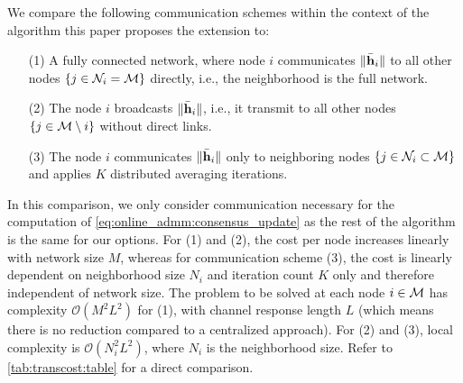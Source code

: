 \documentclass{article}
\begin{document}
We compare the following communication schemes within the context of the algorithm \cite{blochbergerDBSI} this paper proposes the extension to:
\begin{itemize}
    \itemsep-0.2em
    \item[(1)] A fully connected network, where node \(i\) communicates \(\|\bar{\bm{\mathrm{h}}}_i\|\) to all other nodes \(\{j \in \mathcal{N}_i = \mathcal{M}\}\) directly, i.e., the neighborhood is the full network.
    \item[(2)] The node \(i\) broadcasts \(\|\bar{\bm{\mathrm{h}}}_i\|\), i.e., it transmit to all other nodes \(\{j \in \mathcal{M} \setminus i\}\) without direct links.
    \item[(3)] The node \(i\) communicates \(\|\bar{\bm{\mathrm{h}}}_i\|\) only to neighboring nodes \(\{j \in \mathcal{N}_i \subset \mathcal{M}\}\) and applies \(K\) distributed averaging iterations.
\end{itemize}
In this comparison, we only consider communication necessary for the computation of \eqref{eq:online_admm:consensus_update} as the rest of the algorithm is the same for our options.
For (1) and (2), the cost per node increases linearly with network size \(M\), whereas for communication scheme (3), the cost is linearly dependent on neighborhood size \(N_i\) and iteration count \(K\) only and therefore independent of network size.
The problem to be solved at each node \(i \in \mathcal{M}\) has complexity \(\mathcal{O}(M^2 L^2)\) for (1), with channel response length \(L\) (which means there is no reduction compared to a centralized approach).
For (2) and (3), local complexity is \(\mathcal{O}(N_i^2 L^2)\), where \(N_i\) is the neighborhood size.
Refer to \autoref{tab:transcost:table} for a direct comparison.
\end{document}

